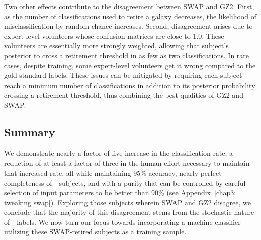 Two other effects contribute to the disagreement between SWAP and GZ2. First, as the number of classifications used to retire a galaxy decreases, the likelihood of misclassification by random chance increases. Second, disagreement arises due to expert-level volunteers whose confusion matrices are close to 1.0. These volunteers are essentially more strongly weighted, allowing that subject's posterior to cross a retirement threshold in as few as two classifications. In rare cases, despite training, some expert-level 
volunteers get it wrong compared to the gold-standard labels. These issues can be mitigated by requiring each subject reach a minimum number of classifications in addition to its posterior probability crossing a retirement threshold, thus combining the best qualities of GZ2 and SWAP. 


\subsection{Summary}



We demonstrate nearly a factor of five increase in the classification rate, a reduction of at least a factor of three in the human effort necessary to maintain that increased rate, all while maintaining 95\% accuracy, nearly perfect completeness of~\feat~subjects, and with a purity that can be controlled by careful selection of input parameters to be better than 90\% (see Appendix~\ref{chap3: tweaking swap}). Exploring those subjects wherein SWAP and GZ2 disagree, we conclude that the majority of this disagreement stems from the stochastic nature of~\raw~labels. We now turn our focus towards incorporating a machine classifier utilizing these SWAP-retired subjects as a training sample. 



